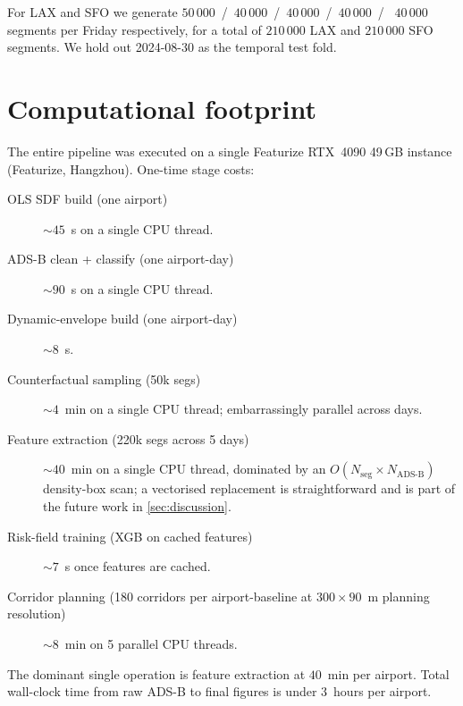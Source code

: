For LAX and SFO we generate $50\,000$~/~$40\,000$~/~$40\,000$~/~$40\,000$~/~
$40\,000$ segments per Friday respectively, for a total of $210\,000$ LAX
and $210\,000$ SFO segments. We hold out 2024-08-30 as the temporal test
fold.

\section{Computational footprint}
\label{sec:appendix-compute}

The entire pipeline was executed on a single Featurize RTX~4090 49\,GB
instance (Featurize, Hangzhou). One-time stage costs:

\begin{description}
    \item[OLS SDF build (one airport)] $\sim 45$~s on a single CPU thread.
    \item[ADS-B clean + classify (one airport-day)] $\sim 90$~s on a
        single CPU thread.
    \item[Dynamic-envelope build (one airport-day)] $\sim 8$~s.
    \item[Counterfactual sampling (50k segs)] $\sim 4$~min on a single
        CPU thread; embarrassingly parallel across days.
    \item[Feature extraction (220k segs across 5 days)] $\sim 40$~min
        on a single CPU thread, dominated by an $O(N_{\mathrm{seg}}
        \times N_{\mathrm{ADS\text{-}B}})$ density-box scan; a
        vectorised replacement is straightforward and is part of the
        future work in \cref{sec:discussion}.
    \item[Risk-field training (XGB on cached features)] $\sim 7$~s once
        features are cached.
    \item[Corridor planning (180 corridors per airport-baseline at
        $300\times90$~m planning resolution)] $\sim 8$~min on 5 parallel
        CPU threads.
\end{description}

The dominant single operation is feature extraction at $40$~min per
airport. Total wall-clock time from raw ADS-B to final figures is under
$3$~hours per airport.
